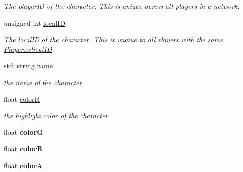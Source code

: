 \begin{DoxyCompactItemize}
\begin{DoxyCompactList}\small\item\em The player\-I\-D of the character. This is unique across all players in a network. \end{DoxyCompactList}\item 
\hypertarget{class_game_state_1_1_player_ab1600ee9b9d01027e5304e991be11407}{unsigned int \hyperlink{class_game_state_1_1_player_ab1600ee9b9d01027e5304e991be11407}{local\-I\-D}}\label{class_game_state_1_1_player_ab1600ee9b9d01027e5304e991be11407}

\begin{DoxyCompactList}\small\item\em The local\-I\-D of the character. This is unqiue to all players with the same \hyperlink{class_game_state_1_1_player_aacc123df8ea5256f83c1060a5fdd19c2}{Player\-::client\-I\-D}. \end{DoxyCompactList}\item 
\hypertarget{class_game_state_1_1_player_a6638478952037ab0d1b3b0a3c496a820}{std\-::string \hyperlink{class_game_state_1_1_player_a6638478952037ab0d1b3b0a3c496a820}{name}}\label{class_game_state_1_1_player_a6638478952037ab0d1b3b0a3c496a820}

\begin{DoxyCompactList}\small\item\em the name of the character \end{DoxyCompactList}\item 
\hypertarget{class_game_state_1_1_player_a54b350ee750dd994b421ad4332448112}{float \hyperlink{class_game_state_1_1_player_a54b350ee750dd994b421ad4332448112}{color\-R}}\label{class_game_state_1_1_player_a54b350ee750dd994b421ad4332448112}

\begin{DoxyCompactList}\small\item\em the highlight color of the character \end{DoxyCompactList}\item 
\hypertarget{class_game_state_1_1_player_a26c9551e961a1f601fd689f3677ce277}{float {\bfseries color\-G}}\label{class_game_state_1_1_player_a26c9551e961a1f601fd689f3677ce277}

\item 
\hypertarget{class_game_state_1_1_player_ad3f992ed5676471f80c6ba3c9ce0f505}{float {\bfseries color\-B}}\label{class_game_state_1_1_player_ad3f992ed5676471f80c6ba3c9ce0f505}

\item 
\hypertarget{class_game_state_1_1_player_a828e830d7461991e4980f7fc7336e552}{float {\bfseries color\-A}}\label{class_game_state_1_1_player_a828e830d7461991e4980f7fc7336e552}


\end{DoxyCompactItemize}
